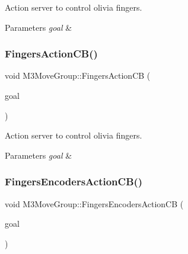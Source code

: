 Action server to control olivia fingers. 


\begin{DoxyParams}{Parameters}
{\em goal} & \\
\hline
\end{DoxyParams}
\mbox{\label{classM3MoveGroup_a50f3c0ec424696c8d613cbfb18829384}} 
\subsubsection{\texorpdfstring{Fingers\+Action\+C\+B()}{FingersActionCB()}\hspace{0.1cm}{\footnotesize\ttfamily [2/2]}}
{\footnotesize\ttfamily void M3\+Move\+Group\+::\+Fingers\+Action\+CB (\begin{DoxyParamCaption}\item[{const m3\+\_\+moveit\+::\+Moveit\+Fingers\+Goal\+Const\+Ptr \&}]{goal }\end{DoxyParamCaption})\hspace{0.3cm}{\ttfamily [inline]}}



Action server to control olivia fingers. 


\begin{DoxyParams}{Parameters}
{\em goal} & \\
\hline
\end{DoxyParams}
\mbox{\label{classM3MoveGroup_ab202574f8621d26c6369c1b794014251}} 
\subsubsection{\texorpdfstring{Fingers\+Encoders\+Action\+C\+B()}{FingersEncodersActionCB()}\hspace{0.1cm}{\footnotesize\ttfamily [1/2]}}
{\footnotesize\ttfamily void M3\+Move\+Group\+::\+Fingers\+Encoders\+Action\+CB (\begin{DoxyParamCaption}\item[{const m3\+\_\+moveit\+::\+Moveit\+Fingers\+Goal\+Const\+Ptr \&}]{goal }\end{DoxyParamCaption})\hspace{0.3cm}{\ttfamily [inline]}}



